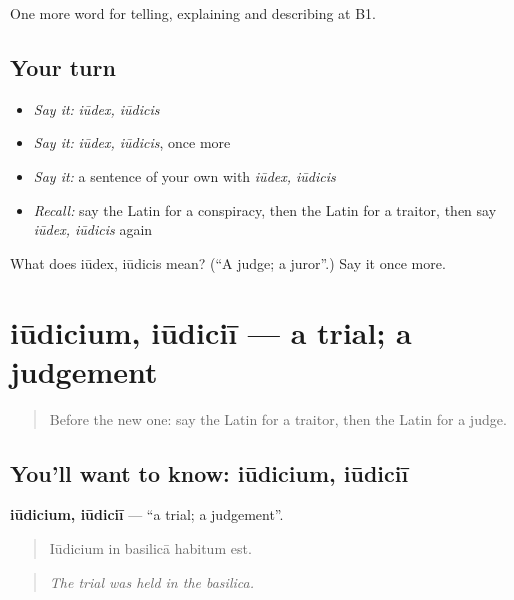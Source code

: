 \begin{grammarlens}[title={What you've built}]
One more word for telling, explaining and describing at B1.
\end{grammarlens}

\subsection*{Your turn}
\begin{itemize}
\raggedright
  \item \emph{Say it:} \emph{iūdex, iūdicis}
  \item \emph{Say it:} \emph{iūdex, iūdicis}, once more
  \item \emph{Say it:} a sentence of your own with \emph{iūdex, iūdicis}
  \item \emph{Recall:} say the Latin for a conspiracy, then the Latin for a traitor, then say \emph{iūdex, iūdicis} again
\end{itemize}

\begin{tcolorbox}[breakable,colback=teal!4,colframe=teal!35!black,title={Before you move on}]
What does iūdex, iūdicis mean? (\textquotedblleft{}A judge; a juror\textquotedblright{}.) Say it once more.
\end{tcolorbox}
\section[iūdicium, iūdiciī]{iūdicium, iūdiciī — a trial; a judgement}

\label{lesson:LA-C308-iudicium}



\begin{quote}
Before the new one: say the Latin for a traitor, then the Latin for a judge.
\end{quote}

\subsection*{You'll want to know: iūdicium, iūdiciī}
\textbf{iūdicium, iūdiciī} — \textquotedblleft{}a trial; a judgement\textquotedblright{}.

\begin{quote}
Iūdicium in basilicā habitum est.
\end{quote}

\begin{quote}
\emph{The trial was held in the basilica.}
\end{quote}

